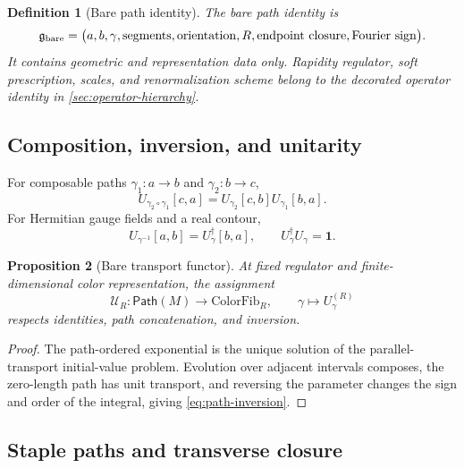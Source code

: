 \documentclass[11pt]{article}
\newtheorem{definition}{Definition}[section]
\newtheorem{proposition}[definition]{Proposition}
\newcommand{\Path}{\mathsf{Path}}
\newcommand{\cU}{\mathcal U}
\newcommand{\bbone}{\bm 1}
\begin{document}
\begin{definition}[Bare path identity]
\label{def:bare-path-id}
The bare path identity is
\begin{equation}
 \mathfrak g_{\rm bare}
 =\bigl(
 a,b,\gamma,\mathrm{segments},\mathrm{orientation},R,
 \mathrm{endpoint\ closure},\mathrm{Fourier\ sign}
 \bigr).
\label{eq:bare-path-identity}
\end{equation}
It contains geometric and representation data only.  Rapidity regulator,
soft prescription, scales, and renormalization scheme belong to the decorated
operator identity in \cref{sec:operator-hierarchy}.
\end{definition}

\subsection{Composition, inversion, and unitarity}

For composable paths \(\gamma_1:a\to b\) and \(\gamma_2:b\to c\),
\begin{equation}
 U_{\gamma_2\circ\gamma_1}[c,a]
 =U_{\gamma_2}[c,b]U_{\gamma_1}[b,a].
\label{eq:path-composition}
\end{equation}
For Hermitian gauge fields and a real contour,
\begin{equation}
 U_{\gamma^{-1}}[a,b]
 =U_\gamma^\dagger[b,a],
 \qquad
 U_\gamma^\dagger U_\gamma=\bbone.
\label{eq:path-inversion}
\end{equation}

\begin{proposition}[Bare transport functor]
\label{prop:path-functor}
At fixed regulator and finite-dimensional color representation, the
assignment
\begin{equation}
 \cU_R:\Path(M)\longrightarrow\mathrm{ColorFib}_R,
 \qquad
 \gamma\longmapsto U_\gamma^{(R)}
\label{eq:path-functor}
\end{equation}
respects identities, path concatenation, and inversion.
\end{proposition}

\begin{proof}
The path-ordered exponential is the unique solution of the parallel-transport
initial-value problem.  Evolution over adjacent intervals composes, the
zero-length path has unit transport, and reversing the parameter changes the
sign and order of the integral, giving \cref{eq:path-inversion}.
\end{proof}

\subsection{Staple paths and transverse closure}
\end{document}
